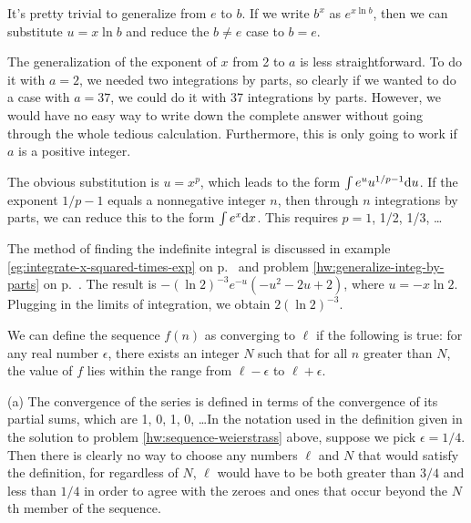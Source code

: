 
It's pretty trivial to generalize from $e$ to $b$. If we write $b^x$ as $e^{x\ln b}$, then
we can substitute $u=x \ln b$ and reduce the $b\ne e$ case to $b=e$.

The generalization of the exponent of $x$ from 2 to $a$ is less straightforward. To do it
with $a=2$, we needed two integrations by parts, so clearly if we wanted to do a case with
$a=37$, we could do it with 37 integrations by parts. However, we would  have no easy way to
write down the complete answer without going through the whole tedious calculation. Furthermore,
this is only going to work if $a$ is a positive integer.

The obvious substitution is $u=x^p$, which leads to the form
$\int e^u u^{1/p-1}\textup{d} u$. If the exponent $1/p-1$ equals a nonnegative integer $n$, then
through $n$ integrations by parts, we can reduce this to the form $\int e^x\textup{d} x$.
This requires $p=1$, 1/2, 1/3, \ldots



The method of finding the indefinite integral is discussed in example \ref{eg:integrate-x-squared-times-exp} on p.~\pageref{eg:integrate-x-squared-times-exp}
and problem \ref{hw:generalize-integ-by-parts} on p.~\pageref{hw:generalize-integ-by-parts}. The result is
$-(\ln 2)^{-3}e^{-u}\left(-u^2-2u+2\right)$, where $u=-x\ln 2$. Plugging in the limits of integration, we obtain $2(\ln 2)^{-3}$.



We can define the sequence $f(n)$ as converging to $\ell$
if the following is true: for any real number $\epsilon$, there exists an integer
$N$ such that for all $n$ greater than $N$,
the value of $f$ lies within the range from $\ell-\epsilon$ to $\ell+\epsilon$.


(a) The convergence of the series is defined in terms of the convergence of its partial sums,
which are 1, 0, 1, 0, \ldots In the notation used in the definition given in the solution to
problem \ref{hw:sequence-weierstrass} above, suppose we pick $\epsilon=1/4$. Then there is
clearly no way to choose any numbers $\ell$ and $N$ that would satisfy the definition,
for regardless of $N$, $\ell$ would have to be both greater than $3/4$ and less than $1/4$
in order to agree with the zeroes and ones that occur beyond the $N$th member of the sequence.

